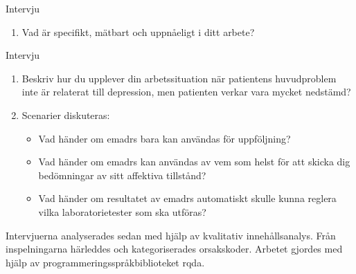 \documentclass[12pt,a4paper,oneside]{article}
\let\oldcite\cite
\renewcommand*\cite[1]{\textsuperscript{\oldcite{#1}}}
\begin{document}
Intervju {}\vspace{-.33em}
\begin{enumerate}[label=\sc 1.\arabic*.]
\item {\bf} Vad {\"a}r specifikt, m{\"a}tbart och uppn{\aa}eligt i ditt arbete?
\end{enumerate}
Intervju {}\vspace{-.33em}
\begin{enumerate}[label=\sc 2.\arabic*.]
\item {\bf} Beskriv hur du upplever din arbetssituation n{\"a}r patientens huvudproblem inte {\"a}r relaterat till depression, men patienten verkar vara mycket nedst{\"a}md?\vspace{-.33em}
\item {\bf} Scenarier diskuteras:\vspace{-.33em}
\begin{itemize}\vspace{-.33em}
\item {\bf} Vad h{\"a}nder om e{\sc madrs} bara kan anv{\"a}ndas f{\"or} uppf{\"o}ljning?\vspace{-.33em}
\item {\bf} Vad h{\"a}nder om e{\sc madrs} kan anv{\"a}ndas av vem som helst f{\"o}r att skicka dig bed{\"o}mningar av sitt affektiva tillst{\aa}nd?\vspace{-.33em}
\item {\bf} Vad h{\"a}nder om resultatet av e{\sc madrs} automatiskt skulle kunna reglera vilka laboratorietester som ska utf{\"o}ras?
\end{itemize}
\end{enumerate}
Intervjuerna analyserades sedan med hj{\"a}lp av kvalitativ inneh{\aa}llsanalys\cite{analysis1}. Fr{\aa}n inspelningarna h{\"a}rleddes och kategoriserades orsakskoder. Arbetet gjordes med hj{\"a}lp av programmeringsspr{\aa}kbiblioteket {\sc rqda}\cite{rqda}.
\end{document}
